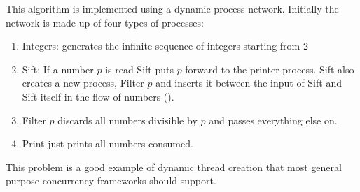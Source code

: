 \documentclass[12pt,twoside,notitlepage]{report}
\theoremstyle{plain}%
\theoremstyle{definition}
\theoremstyle{remark}
\begin{document}
This algorithm is implemented using a dynamic process network. Initially the network is made up of four types of processes:
\begin{enumerate}
\item{Integers: generates the infinite sequence of integers starting from 2}
\item{Sift: If a number $ p $ is read Sift puts $ p $ forward to the printer process. Sift also creates a new process, Filter $ p $ and inserts it between the input of Sift and Sift itself in the flow of numbers (). }
\item{Filter $ p $ discards all numbers divisible by $ p $ and passes everything else on.}
\item{Print just prints all numbers consumed.}
\end{enumerate}

This problem is a good example of dynamic thread creation that most general purpose concurrency frameworks should support.
\end{document}
